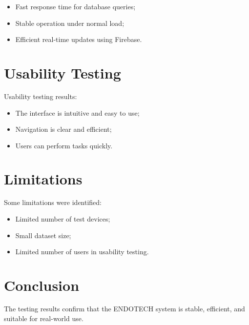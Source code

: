 \begin{itemize}
    \item Fast response time for database queries;
    \item Stable operation under normal load;
    \item Efficient real-time updates using Firebase.
\end{itemize}

\section{Usability Testing}

Usability testing results:

\begin{itemize}
    \item The interface is intuitive and easy to use;
    \item Navigation is clear and efficient;
    \item Users can perform tasks quickly.
\end{itemize}

\section{Limitations}

Some limitations were identified:

\begin{itemize}
    \item Limited number of test devices;
    \item Small dataset size;
    \item Limited number of users in usability testing.
\end{itemize}

\section{Conclusion}

The testing results confirm that the ENDOTECH system is stable, efficient, and suitable for real-world use.